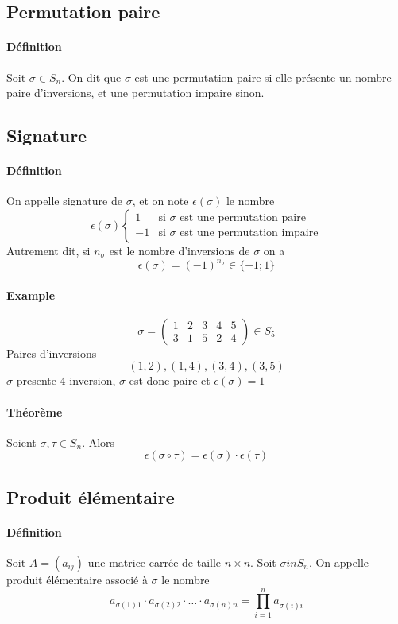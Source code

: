 %
\subsection{Permutation paire}
%
\paragraph{Définition} Soit $\sigma \in S_n$. On dit que $\sigma$ est une permutation paire si elle présente un nombre paire d'inversions, et une permutation impaire sinon.

%
\subsection{Signature}
%
\paragraph{Définition} On appelle signature de $\sigma$, et on note $\epsilon(\sigma)$ le nombre
$$\epsilon(\sigma) \left\{ \begin{array}{lr} 1 & \text{si } \sigma \text{ est une permutation paire} \\ -1 & \text{si } \sigma \text{ est une permutation impaire} \end{array}$$
Autrement dit, si $n_{\sigma}$ est le nombre d'inversions de $\sigma$ on a
$$\epsilon(\sigma) = (-1)^{n_{\sigma}} \in \{-1; 1\}$$

\paragraph{Example}
$$\sigma = \begin{pmatrix} 1 & 2 & 3 & 4 & 5 \\ 3 & 1 & 5 & 2 & 4 \end{pmatrix} \in S_5$$
Paires d'inversions
$$(1, 2), (1, 4), (3, 4), (3, 5)$$
$\sigma$ presente $4$ inversion, $\sigma$ est donc paire et $\epsilon(\sigma) = 1$

\paragraph{Théorème} Soient $\sigma, \tau \in S_n$. Alors
$$\epsilon(\sigma \circ \tau) = \epsilon(\sigma) \cdot \epsilon(\tau)$$

%
\subsection{Produit élémentaire}
%
\paragraph{Définition} Soit $A = (a_{ij})$ une matrice carrée de taille $n\times n$. Soit $\sigma in S_n$. On appelle produit élémentaire associé à $\sigma$ le nombre
$$a_{\sigma(1) 1} \cdot a_{\sigma(2) 2} \cdot \ldots \cdot a_{\sigma(n) n} = \prod_{i=1}^{n} a_{\sigma(i) i}$$
%
